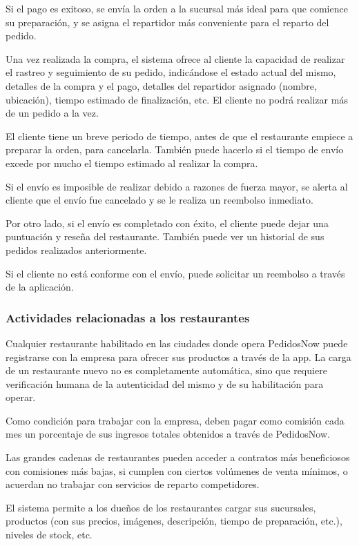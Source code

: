Si el pago es exitoso, se envía la orden a la sucursal más ideal para que comience su preparación, y se asigna el repartidor más conveniente para el reparto del pedido.

Una vez realizada la compra, el sistema ofrece al cliente la capacidad de realizar el rastreo y seguimiento de su pedido, indicándose el estado actual del mismo, detalles de la compra y el pago, detalles del repartidor asignado (nombre, ubicación), tiempo estimado de finalización, etc. El cliente no podrá realizar más de un pedido a la vez.

El cliente tiene un breve periodo de tiempo, antes de que el restaurante empiece a preparar la orden, para cancelarla. También puede hacerlo si el tiempo de envío excede por mucho el tiempo estimado al realizar la compra.

Si el envío es imposible de realizar debido a razones de fuerza mayor, se alerta al cliente que el envío fue cancelado y se le realiza un reembolso inmediato.

Por otro lado, si el envío es completado con éxito, el cliente puede dejar una puntuación y reseña del restaurante. También puede ver un historial de sus pedidos realizados anteriormente.

Si el cliente no está conforme con el envío, puede solicitar un reembolso a través de la aplicación.

\subsubsection{Actividades relacionadas a los restaurantes}

Cualquier restaurante habilitado en las ciudades donde opera PedidosNow puede registrarse con la empresa para ofrecer sus productos a través de la app. La carga de un restaurante nuevo no es completamente automática, sino que requiere verificación humana de la autenticidad del mismo y de su habilitación para operar.

Como condición para trabajar con la empresa, deben pagar como comisión cada mes un porcentaje de sus ingresos totales obtenidos a través de PedidosNow.

Las grandes cadenas de restaurantes pueden acceder a contratos más beneficiosos con comisiones más bajas, si cumplen con ciertos volúmenes de venta mínimos, o acuerdan no trabajar con servicios de reparto competidores.

El sistema permite a los dueños de los restaurantes cargar sus sucursales, productos (con sus precios, imágenes, descripción, tiempo de preparación, etc.), niveles de stock, etc.

